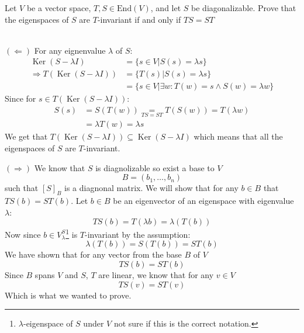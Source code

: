 \documentclass[11pt, a4paper]{article}
\DeclareMathOperator{\Ker}{Ker}
\begin{document}
\begin{exercise}
  Let $V$ be a vector space, $T,S\in \text{End}(V)$, and let $S$ be 
  diagonalizable. Prove that the eigenspaces of $S$ are $T$-invariant if 
  and only if $TS = ST$
\end{exercise}
\begin{solution} \phantom{} \\
  {$(\Leftarrow)$}
  For any eignenvalue $\lambda$ of $S$:
  \begin{align*}
    \Ker(S-\lambda I) &= \{s \in V \vert S(s) = \lambda s\} \\
    \Rightarrow T(\Ker(S-\lambda I)) &= \{T(s) \vert S(s) = \lambda s\} \\
    &= \{s \in V \vert \exists w\colon T(w) = s \land S(w) = \lambda w\}
  \end{align*}
  Since for $s\in T(\Ker(S-\lambda I))$:
  \begin{align*}
    S(s) &= S(T(w)) \underset{TS=ST}{=} T(S(w)) = T(\lambda w) \\ &= 
    \lambda T(w) = \lambda s
  \end{align*}
  We get that $T(\Ker(S-\lambda I)) \subseteq \Ker(S-\lambda I)$ which means
  that all the eigenspaces of $S$ are $T$-invariant.

  \noindent
  {$(\Rightarrow)$}
  We know that $S$ is diagnolizable so exist a base to $V$
  \[
   B = (b_1,\dots,b_n)
  \]
  such that $[S]_B$ is a diagnonal matrix. We will show that for any $b\in B$
  that $TS(b) = ST(b)$. Let $b\in B$ be an eigenvector of an eigenspace
  with eigenvalue $\lambda$:
  \[
    TS(b) = T(\lambda b) = \lambda (T(b))
  \]
  Now since $b\in V_\lambda^S$\footnote{$\lambda$-eigenspace of $S$ under $V$
  not sure if this is the correct notation.} is $T$-invariant by the
  assumption:
  \[
    \lambda (T(b)) = S(T(b)) = ST(b)
  \]
  We have shown that for any vector from the base $B$ of $V$
  \[
    TS(b) = ST(b)
  \]
  Since $B$ spans $V$ and $S$, $T$ are linear, we know that for any $v\in V$
  \[
    TS(v) = ST(v)
  \]
  Which is what we wanted to prove.
\end{solution}
\end{document}
